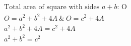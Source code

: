 \documentclass[preview]{standalone}
\begin{document}
\begin{align*}
\text{Total area of square with sides $a + b$: O} \\ O = a^2 + b^2 + 4A \ \& \ O = c^2 + 4A \\  a^2 + b^2 + 4A = c^2 + 4A \\ a^2 + b^2 = c^2
\end{align*}
\end{document}
